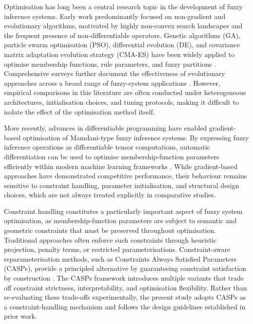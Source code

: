 \documentclass[a4paper,12pt,oneside]{article}
\begin{document}
Optimisation has long been a central research topic in the development of
fuzzy inference systems.
Early work predominantly focused on non-gradient and evolutionary algorithms,
motivated by highly non-convex search landscapes and the frequent presence of
non-differentiable operators.
Genetic algorithms (GA), particle swarm optimisation (PSO), differential
evolution (DE), and covariance matrix adaptation evolution strategy (CMA-ES)
have been widely applied to optimise membership functions, rule parameters,
and fuzzy partitions
\cite{holland1975ga, kennedy1995pso, storn1997de, hansen2001cmaes}.
Comprehensive surveys further document the effectiveness of evolutionary
approaches across a broad range of fuzzy-system applications
\cite{cordon2001review}.
However, empirical comparisons in this literature are often conducted under
heterogeneous architectures, initialisation choices, and tuning protocols,
making it difficult to isolate the effect of the optimisation method itself.

More recently, advances in differentiable programming have enabled
gradient-based optimisation of Mamdani-type fuzzy inference systems.
By expressing fuzzy inference operations as differentiable tensor computations,
automatic differentiation can be used to optimise membership-function
parameters efficiently within modern machine learning frameworks
\cite{chen2024gradient}.
While gradient-based approaches have demonstrated competitive performance,
their behaviour remains sensitive to constraint handling, parameter
initialisation, and structural design choices, which are not always treated
explicitly in comparative studies.

Constraint handling constitutes a particularly important aspect of fuzzy
system optimisation, as membership-function parameters are subject to semantic
and geometric constraints that must be preserved throughout optimisation.
Traditional approaches often enforce such constraints through heuristic
projection, penalty terms, or restricted parameterisations.
Constraint-aware reparameterisation methods, such as Constraints Always
Satisfied Parameters (CASPs), provide a principled alternative by guaranteeing
constraint satisfaction by construction
\cite{chen2025casp}.
The CASPs framework introduces multiple variants that trade off constraint
strictness, interpretability, and optimisation flexibility.
Rather than re-evaluating these trade-offs experimentally, the present study
adopts CASPs as a constraint-handling mechanism and follows the design
guidelines established in prior work.
\end{document}
